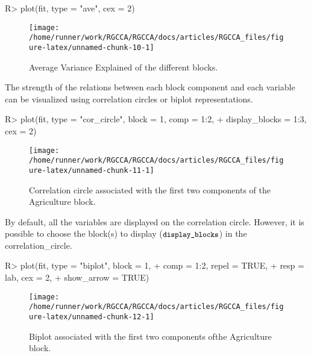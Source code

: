 \documentclass[
]{jss}
\begin{document}
\footnotesize

\begin{CodeChunk}
\begin{CodeInput}
R> plot(fit, type = "ave", cex = 2)
\end{CodeInput}
\begin{figure}[H]

{\centering \texttt{[image: /home/runner/work/RGCCA/RGCCA/docs/articles/RGCCA\_files/figure-latex/unnamed-chunk-10-1]} 

}

\caption[Average Variance Explained of the different blocks]{Average Variance Explained of the different blocks.}\label{fig:unnamed-chunk-10}
\end{figure}
\end{CodeChunk}

\normalsize

The strength of the relations between each block component and each
variable can be visualized using correlation circles or biplot
representations.

\footnotesize

\begin{CodeChunk}
\begin{CodeInput}
R> plot(fit, type = "cor_circle", block = 1, comp = 1:2, 
+      display_blocks = 1:3, cex = 2)
\end{CodeInput}
\begin{figure}[H]

{\centering \texttt{[image: /home/runner/work/RGCCA/RGCCA/docs/articles/RGCCA\_files/figure-latex/unnamed-chunk-11-1]} 

}

\caption[Correlation circle associated with the first two components of the Agriculture block]{Correlation circle associated with the first two components of the Agriculture block.}\label{fig:unnamed-chunk-11}
\end{figure}
\end{CodeChunk}

\normalsize

By default, all the variables are displayed on the correlation circle.
However, it is possible to choose the block(s) to display
(\(\small{\texttt{display\_blocks}}\)) in the correlation\_circle.

\footnotesize

\begin{CodeChunk}
\begin{CodeInput}
R> plot(fit, type = "biplot", block = 1, 
+      comp = 1:2, repel = TRUE, 
+      resp = lab, cex = 2,
+      show_arrow = TRUE)
\end{CodeInput}
\begin{figure}[H]

{\centering \texttt{[image: /home/runner/work/RGCCA/RGCCA/docs/articles/RGCCA\_files/figure-latex/unnamed-chunk-12-1]} 

}

\caption[Biplot associated with the first two components ofthe Agriculture block]{Biplot associated with the first two components ofthe Agriculture block.}\label{fig:unnamed-chunk-12}
\end{figure}
\end{CodeChunk}
\end{document}

